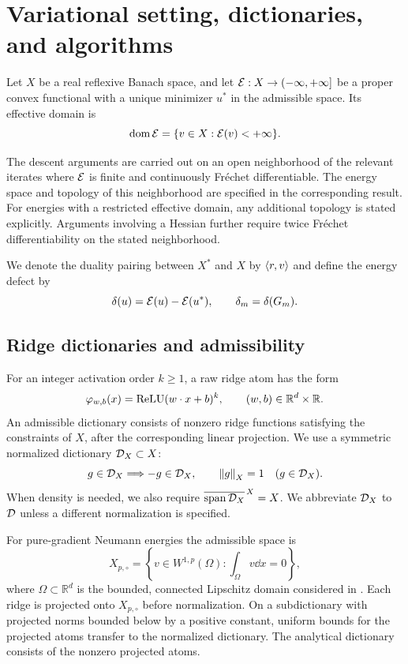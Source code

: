 \section{Variational setting, dictionaries, and algorithms}
\label{sec:setting}

Let \(X\) be a real reflexive Banach space, and let
\(\mathcal{E}:X\to(-\infty,+\infty]\) be a proper convex functional with a unique
minimizer \(u^*\) in the admissible space. Its effective domain is
\[
  \operatorname{dom}\mathcal{E}=\{v\in X:\mathcal{E}(v)<+\infty\}.
\]

The descent arguments are carried out on an open neighborhood of the
relevant iterates where \(\mathcal{E}\) is finite and continuously Fr\'echet
differentiable. The energy space and topology of this neighborhood
are specified in the corresponding result. For energies with a restricted
effective domain, any additional topology is stated explicitly.
Arguments involving a Hessian further require twice Fr\'echet
differentiability on the stated neighborhood.

We denote the duality pairing between \(X^*\) and \(X\) by \(\left\langle r,v\right\rangle\)
and define the energy defect by
\[
  \delta(u)=\mathcal{E}(u)-\mathcal{E}(u^*),\qquad \delta_m=\delta(G_m).
\]

\subsection{Ridge dictionaries and admissibility}

For an integer activation order \(k\geq1\), a raw ridge atom has the form
\[
  \varphi_{w,b}(x)=\operatorname{ReLU}(w\cdot x+b)^k,
  \qquad (w,b)\in\mathbb{R}^d\times\mathbb{R}.
\]
An admissible dictionary consists of nonzero ridge functions satisfying the constraints of \(X\),
after the corresponding linear projection. We use a symmetric normalized dictionary
\(\mathcal{D}_X\subset X\):
\[
g\in\mathcal{D}_X\Longrightarrow-g\in\mathcal{D}_X,\qquad \left\lVert g\right\rVert_X=1\quad(g\in\mathcal{D}_X).
\]
When density is needed, we also require \(\overline{\operatorname{span}\mathcal{D}_X}^{\,X}=X\).
We abbreviate \(\mathcal{D}_X\) to \(\mathcal{D}\) unless a different normalization is specified.

For pure-gradient Neumann energies the admissible space is
\[
  X_{p,\circ}=\left\{v\in W^{1,p}(\Omega):\int_\Omega v\dd x=0\right\},
\]
where \(\Omega\subset\mathbb R^d\) is the bounded, connected Lipschitz
domain considered in .
Each ridge is projected onto \(X_{p,\circ}\) before normalization. On a subdictionary with projected norms bounded below by a positive constant, uniform bounds for the projected atoms transfer to the normalized dictionary. The analytical dictionary consists of the nonzero projected atoms.

